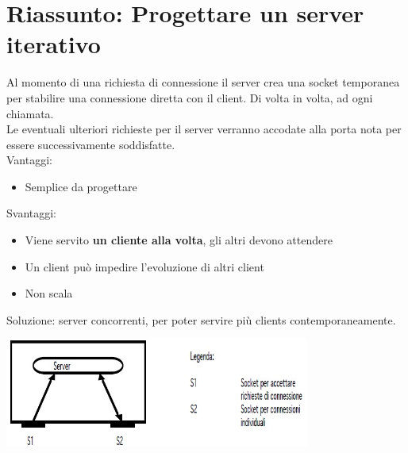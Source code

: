 \section{Riassunto: Progettare un server iterativo}
Al momento di una richiesta di connessione il server crea una socket temporanea per stabilire una connessione diretta con il client. Di volta in volta, ad ogni chiamata.
\\Le eventuali ulteriori richieste per il server verranno accodate alla porta nota per essere successivamente soddisfatte.
\\Vantaggi:
\begin{itemize}
    \item Semplice da progettare
\end{itemize}
Svantaggi:
\begin{itemize}
    \item Viene servito \textbf{un cliente alla volta}, gli altri devono attendere
    \item Un client può impedire l'evoluzione di altri client
    \item Non scala
\end{itemize}
Soluzione: server concorrenti, per poter servire più clients contemporaneamente.
\begin{center}
    \includegraphics[width=0.75\textwidth]{img/serverIterativi1.jpg}
\end{center}

